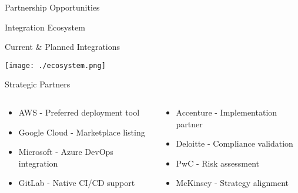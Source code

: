 \documentclass[presentation,aspectratio=169]{beamer}
\begin{document}
\begin{frame}[label={sec:orgac9ea03}]{Partnership Opportunities}
\begin{block}{Integration Ecosystem}
\begin{center}
Current \& Planned Integrations

\begin{center}
\texttt{[image: ./ecosystem.png]}
\end{center}
\end{center}
\end{block}
\begin{block}{Strategic Partners}
\begin{columns}
\begin{column}{0.5\columnwidth}
\begin{itemize}
\item \alert{AWS} - Preferred deployment tool
\item \alert{Google Cloud} - Marketplace listing
\item \alert{Microsoft} - Azure DevOps integration
\item \alert{GitLab} - Native CI/CD support
\end{itemize}
\end{column}
\begin{column}{0.5\columnwidth}
\begin{itemize}
\item \alert{Accenture} - Implementation partner
\item \alert{Deloitte} - Compliance validation
\item \alert{PwC} - Risk assessment
\item \alert{McKinsey} - Strategy alignment
\end{itemize}
\end{column}
\end{columns}
\end{block}
\end{frame}
\end{document}

